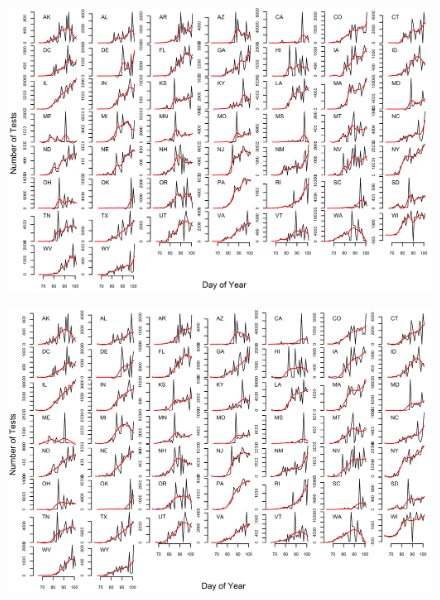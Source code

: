 \documentclass[11pt]{article}
\begin{document}
\begin{figure}
\centering
\hspace*{0cm}\includegraphics[width=16cm]{number_of_tests_span04.png}
\caption{}
\label{fig:bends}
\end{figure} 

\begin{figure}
\centering
\hspace*{0cm}\includegraphics[width=16cm]{number_of_tests_span06.png}
\caption{}
\label{fig:bends}
\end{figure} 
\end{document}
